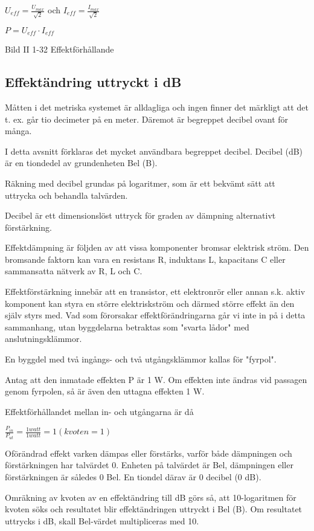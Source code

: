 $U_{eff} = \frac{U_{max}}{\sqrt{2}}$ och $I_{eff} = \frac{I_{max}}{\sqrt{2}}$

$P = U_{eff} \cdot I_{eff}$

Bild II 1-32 Effektförhållande

\subsection{Effektändring uttryckt i dB}
Måtten i det metriska systemet är alldagliga och ingen finner det märkligt att
det t. ex. går tio decimeter på en meter. Däremot är begreppet decibel ovant för
många.

I detta avsnitt förklaras det mycket användbara begreppet decibel. Decibel (dB)
är en tiondedel av grundenheten Bel (B).

Räkning med decibel grundas på logaritmer, som är ett bekvämt sätt att uttrycka
och behandla talvärden.

Decibel är ett dimensionslöst uttryck för graden av dämpning alternativt
förstärkning.

Effektdämpning är följden av att vissa komponenter bromsar elektrisk ström. Den
bromsande faktorn kan vara en resistans R, induktans L, kapacitans C eller
sammansatta nätverk av R, L och C.

Effektförstärkning innebär att en transistor, ett elektronrör eller annan s.k.
aktiv komponent kan styra en större elektriskström och därmed större effekt än
den själv styrs med. Vad som förorsakar effektförändringarna går vi inte in på i
detta sammanhang, utan byggdelarna betraktas som "svarta lådor" med
anslutningsklämmor.

En byggdel med två ingångs- och två utgångsklämmor kallas för "fyrpol".

Antag att den inmatade effekten P är 1 W. Om effekten inte ändras vid passagen
genom fyrpolen, så är även den uttagna effekten 1 W.

Effektförhållandet mellan in- och utgångarna är då

$\frac{P_{in}}{P_{ut}} = \frac{1 watt}{1 watt} = 1 (kvoten = 1)$

Oförändrad effekt varken dämpas eller förstärks, varför både dämpningen och
förstärkningen har talvärdet 0. Enheten på talvärdet är Bel, dämpningen eller
förstärkningen är således 0 Bel. En tiondel därav är 0 decibel (0 dB).

Omräkning av kvoten av en effektändring till dB görs så, att 10-logaritmen för
kvoten söks och resultatet blir effektändringen uttryckt i Bel (B). Om
resultatet uttrycks i dB, skall Bel-värdet multipliceras med 10.

